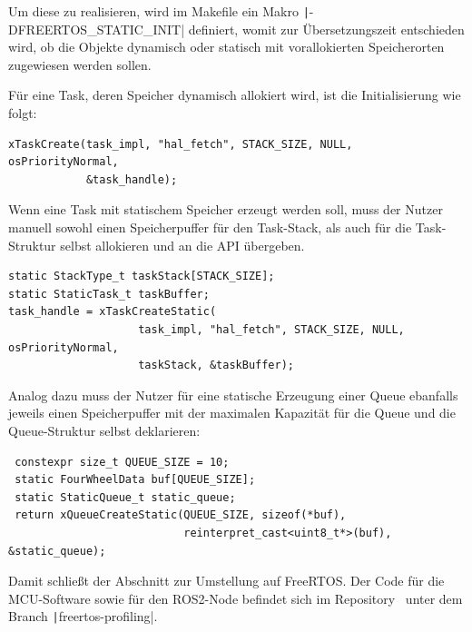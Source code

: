 Um diese zu realisieren, wird im Makefile ein Makro
\texttt|-DFREERTOS_STATIC_INIT| definiert, womit zur Übersetzungszeit
entschieden wird, ob die Objekte dynamisch oder statisch mit vorallokierten
Speicherorten zugewiesen werden sollen.

Für eine Task, deren Speicher dynamisch allokiert wird, ist die Initialisierung
wie folgt:

\begin{code}
\begin{verbatim}
xTaskCreate(task_impl, "hal_fetch", STACK_SIZE, NULL, osPriorityNormal,
            &task_handle);
\end{verbatim}
\end{code}

Wenn eine Task mit statischem Speicher erzeugt werden soll, muss der Nutzer
manuell sowohl einen Speicherpuffer für den Task-Stack, als auch für die
Task-Struktur selbst allokieren und an die API übergeben.

\begin{code}
\begin{verbatim}
static StackType_t taskStack[STACK_SIZE];
static StaticTask_t taskBuffer;
task_handle = xTaskCreateStatic(
                    task_impl, "hal_fetch", STACK_SIZE, NULL, osPriorityNormal,
                    taskStack, &taskBuffer);
\end{verbatim}
\end{code}

Analog dazu muss der Nutzer für eine statische Erzeugung einer Queue ebanfalls
jeweils einen Speicherpuffer mit der maximalen Kapazität für die Queue und die
Queue-Struktur selbst deklarieren:

\begin{code}
\begin{verbatim}
 constexpr size_t QUEUE_SIZE = 10;
 static FourWheelData buf[QUEUE_SIZE];
 static StaticQueue_t static_queue;
 return xQueueCreateStatic(QUEUE_SIZE, sizeof(*buf),
                           reinterpret_cast<uint8_t*>(buf), &static_queue);
\end{verbatim}
\end{code}

Damit schließt der Abschnitt zur Umstellung auf FreeRTOS. Der Code für die
MCU-Software sowie für den ROS2-Node befindet sich im
Repository~\cite{mecarover_freertos_profiling} unter dem Branch
\texttt|freertos-profiling|.

